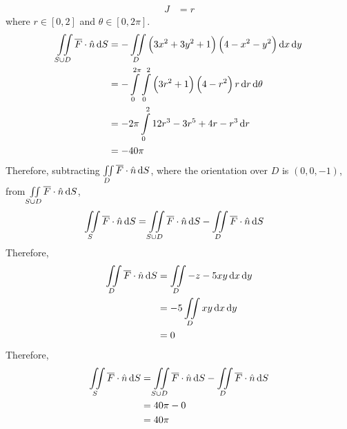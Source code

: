 \documentclass[fleqn, a4paper, 12pt, twoside]{article}
\theoremstyle{definition}
\theoremstyle{theorem}
\begin{document}
\begin{solution}
\begin{align*}
		J &= r
	\end{align*}
	where $r \in [0,2]$ and $\theta \in [0,2 \pi]$.
	\begin{align*}
		\iint\limits_{S \cup D} \overline{F} \cdot \hat{n} \dif S &= -\iint\limits_{D}  \left( 3 x^2 + 3 y^2 + 1 \right) \left( 4 - x^2 - y^2 \right) \dif x \dif y\\
		&= -\int\limits_{0}^{2 \pi} \int\limits_{0}^{2} \left( 3 r^2 + 1 \right) \left( 4 - r^2 \right) r \dif r \dif \theta\\
		&= -2 \pi \int\limits_{0}^{2} 12 r^3 - 3 r^5 + 4 r - r^3 \dif r\\
		&= -40 \pi
	\end{align*}
	Therefore, subtracting $\iint\limits_{D} \overline{F} \cdot \hat{n} \dif S$, where the orientation over $D$ is $(0,0,-1)$, from $\iint\limits_{S \cup D} \overline{F} \cdot \hat{n} \dif S$,
	\begin{align*}
		\iint\limits_{S} \overline{F} \cdot \hat{n} \dif S &= \iint\limits_{S \cup D} \overline{F} \cdot \hat{n} \dif S - \iint\limits_{D} \overline{F} \cdot \hat{n} \dif S
	\end{align*}
	Therefore,
	\begin{align*}
		\iint\limits_{D} \overline{F} \cdot \hat{n} \dif S &= \iint\limits_{D} -z - 5 x y \dif x \dif y\\
		&= -5 \iint\limits_{D} x y \dif x \dif y\\
		&= 0
	\end{align*}
	Therefore,
	\begin{align*}
		\iint\limits_{S} \overline{F} \cdot \hat{n} \dif S &= \iint\limits_{S \cup D} \overline{F} \cdot \hat{n} \dif S - \iint\limits_{D} \overline{F} \cdot \hat{n} \dif S\\
		&= 40 \pi - 0\\
		&= 40 \pi
	\end{align*}
\end{solution}
\end{document}
